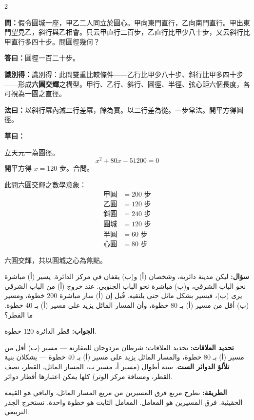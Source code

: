 \documentclass[11pt,a4paper]{article}
\newcommand{\ar}[1]{\arabicfont\beginR #1\endR}
\newcommand{\arb}[1]{\textbf{\arabicfont\beginR #1\endR}}
\newcommand{\arnote}[1]{\textcolor{arabicblue}{\ar{#1}}}
\newcommand{\wen}[1]{\par\noindent\textbf{\textcolor{probcolor}{問：}}{#1}\par}
\newcommand{\da}[1]{\par\noindent\textbf{\textcolor{anscolor}{答曰：}}{#1}\par}
\newcommand{\fayue}[1]{\par\noindent\textbf{\textcolor{methodcolor}{法曰：}}{#1}\par}
\newcommand{\caoyue}[1]{\par\noindent\textbf{草曰：}{#1}\par}
\newcommand{\zhi}[1]{\par\noindent\textbf{識別得：}{#1}\par}
\newcommand{\arwen}[1]{\par\noindent\arb{سؤال: }\arnote{#1}\par}
\newcommand{\arjwb}[1]{\par\noindent\arb{الجواب: }\arnote{#1}\par}
\newcommand{\arqwd}[1]{\par\noindent\arb{الطريقة: }\arnote{#1}\par}
\newcommand{\arfl}[1]{\par\noindent\arb{تحديد العلاقات: }\arnote{#1}\par}
\begin{document}
\begin{paracol}{2}

\begin{leftcolumn}
\wen{假令圓城一座，甲乙二人同立於圓心。甲向東門直行，乙向南門直行。甲出東門望見乙，斜行與乙相會。只云甲直行二百步，乙直行比甲少八十步，又云斜行比甲直行多四十步。問圓徑幾何？}

\da{圓徑一百二十步。}

\zhi{識別得：此問雙重比較條件——乙行比甲少八十步、斜行比甲多四十步——形成\textbf{六圓交輝}之構型。甲行、乙行、斜行、圓徑、半徑、弦心距六個長度，各可視為一圓之直徑。}

\fayue{以斜行冪內減二行差冪，餘為實。以二行差為從。一步常法。開平方得圓徑。}

\caoyue{
立天元一為圓徑。
$$x^2 + 80x - 51200 = 0$$
開平方得 $x = 120$ 步。合問。

此問六圓交輝之數學意象：
\begin{align*}
\text{甲圓} &= 200 \text{ 步} \\
\text{乙圓} &= 120 \text{ 步} \\
\text{斜圓} &= 240 \text{ 步} \\
\text{圓城} &= 120 \text{ 步} \\
\text{半圓} &= 60 \text{ 步} \\
\text{心圓} &= 80 \text{ 步}
\end{align*}

六圓交輝，共以圓城之心為焦點。}
\end{leftcolumn}

\begin{rightcolumn}
\arwen{ليكن مدينة دائرية، وشخصان (أ) و(ب) يقفان في مركز الدائرة. يسير (أ) مباشرة نحو الباب الشرقي، و(ب) مباشرة نحو الباب الجنوبي. عند خروج (أ) من الباب الشرقي يرى (ب)، فيسير بشكل مائل حتى يلتقيه. قُيل إن (أ) سار مباشرة 200 خطوة، ومسير (ب) أقل من مسير (أ) بـ 80 خطوة، وأن المسار المائل يزيد على مسير (أ) بـ 40 خطوة. ما القطر؟}

\arjwb{قطر الدائرة 120 خطوة.}

\arfl{تحديد العلاقات: شرطان مزدوجان للمقارنة — مسير (ب) أقل من مسير (أ) بـ 80 خطوة، والمسار المائل يزيد على مسير (أ) بـ 40 خطوة — يشكلان بنية \textbf{تلألؤ الدوائر الست}. ستة أطوال (مسير أ، مسير ب، المسار المائل، القطر، نصف القطر، ومسافة مركز الوتر) كلها يمكن اعتبارها أقطار دوائر.}

\arqwd{نطرح مربع فرق المسيرين من مربع المسار المائل، والباقي هو القيمة الحقيثية. فرق المسيرين هو المعامل. المعامل الثابت هو خطوة واحدة. نستخرج الجذر التربيعي.}


\end{rightcolumn}
\end{paracol}
\end{document}
